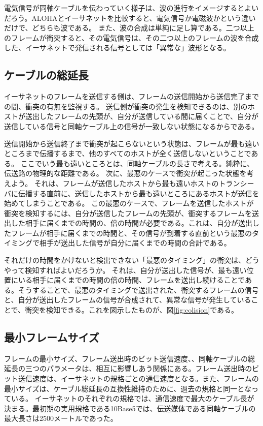 電気信号が同軸ケーブルを伝わっていく様子は、波の進行をイメージするとよいだろう。ALOHAとイーサネットを比較すると、電気信号か電磁波かという違いだけで、どちらも波である。
また、波の合成は単純に足し算である。二つ以上のフレームが衝突すると、その電気信号は、その二つ以上のフレームの波を合成した、イーサネットで発信される信号としては「異常な」波形となる。

\subsection{ケーブルの総延長}

イーサネットのフレームを送信する側は、フレームの送信開始から送信完了までの間、衝突の有無を監視する。
送信側が衝突の発生を検知できるのは、別のホストが送出したフレームの先頭が、自分が送信している間に届くことで、自分が送信している信号と同軸ケーブル上の信号が一致しない状態になるからである。

送信開始から送信終了まで衝突が起こらないという状態は、フレームが最も遠いところまで伝播するまで、他のすべてのホストが全く送信しないということである。
ここでいう最も遠いところとは、同軸ケーブルの長さで考える。純粋に、伝送路の物理的な距離である。
次に、最悪のケースで衝突が起こった状態を考えよう。
それは、フレームが送信したホストから最も遠いホストのトランシーバに伝播する直前に、送信したホストから最も遠いところにあるホストが送信を始めてしまうことである。
この最悪のケースで、フレームを送信したホストが衝突を検知するには、自分が送信したフレームの先頭が、衝突するフレームを送出した相手に届くまでの時間の、倍の時間が必要である。これは、自分が送出したフレームが相手に届くまでの時間と、その信号が到着する直前という最悪のタイミングで相手が送出した信号が自分に届くまでの時間の合計である。

それだけの時間をかけないと検出できない「最悪のタイミング」の衝突は、どうやって検知すればよいだろうか。
それは、自分が送出した信号が、最も遠い位置にいる相手に届くまでの時間の倍の時間、フレームを送出し続けることである。そうすることで、最悪のタイミングで送出された、衝突するフレームの信号と、自分が送出したフレームの信号が合成されて、異常な信号が発生していることで、衝突を検知できる。これを図示したものが、図\ref{fig:colision}である。

\subsection{最小フレームサイズ}

フレームの最小サイズ、フレーム送出時のビット送信速度、、同軸ケーブルの総延長の三つのパラメータは、相互に影響しあう関係にある。フレーム送出時のビット送信速度は、イーサネットの規格ごとの通信速度となる。また、フレームの最小サイズは、ケーブル総延長の互換性維持のために、過去の規格と同一となっている。
イーサネットのそれぞれの規格では、通信速度で最大のケーブル長が決まる。最初期の実用規格である10Base5では、伝送媒体である同軸ケーブルの最大長さは2500メートルであった。

